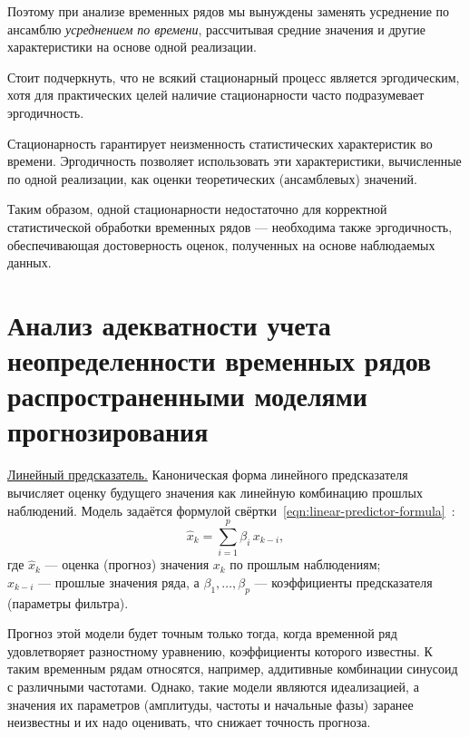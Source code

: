 Поэтому при анализе временных рядов мы вынуждены заменять усреднение по ансамблю \textit{усреднением по времени}, рассчитывая средние значения и другие характеристики на основе одной реализации.


Стоит подчеркнуть, что не всякий стационарный процесс является эргодическим, хотя для практических целей наличие стационарности часто подразумевает эргодичность.

Стационарность гарантирует неизменность статистических характеристик во времени. Эргодичность позволяет использовать эти характеристики, вычисленные по одной реализации, как оценки теоретических (ансамблевых) значений.

Таким образом, одной стационарности недостаточно для корректной статистической обработки временных рядов — необходима также эргодичность, обеспечивающая достоверность оценок, полученных на основе наблюдаемых данных.


\section{Анализ адекватности учета неопределенности временных рядов распространенными моделями прогнозирования}

\underline{Линейный предсказатель.} Каноническая форма линейного предсказателя вычисляет оценку будущего значения как линейную комбинацию прошлых наблюдений. Модель задаётся формулой свёртки~\eqref{eqn:linear-predictor-formula}~\cite{BrockwellDavis2016}:
\begin{equation}
\label{eqn:linear-predictor-formula}
\hat x_k = \sum_{i=1}^{p} \beta_i\,x_{k-i},
\end{equation}
где \(\hat x_k\) --- оценка (прогноз) значения \(x_k\) по прошлым наблюдениям;\\
${}$\quad\enspace$x_{k-i}$ --- прошлые значения ряда, а \(\beta_1,\dots,\beta_p\) --- коэффициенты предсказателя (параметры фильтра).

Прогноз этой модели будет точным только тогда, когда временной ряд удовлетворяет разностному уравнению, коэффициенты которого известны. К таким временным рядам относятся, например, аддитивные комбинации синусоид с различными частотами. Однако, такие модели являются идеализацией, а значения их параметров (амплитуды, частоты и начальные фазы) заранее неизвестны и их надо оценивать, что снижает точность прогноза.

